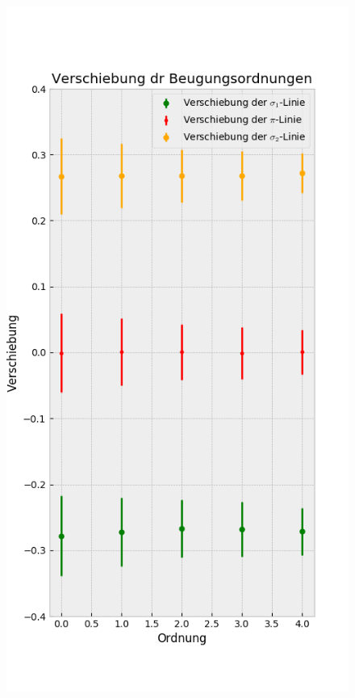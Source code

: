 \begin{landscape}
\begin{figure}
            \includegraphics[width=.45\paperwidth]{Auswertung/scatterorder/diff_sco13A}
          \end{figure}
        \end{landscape}

